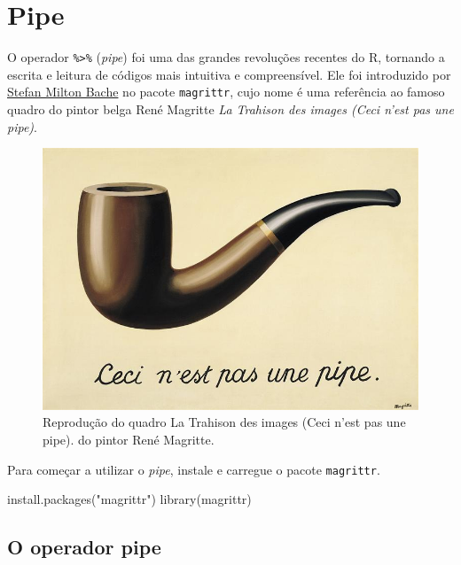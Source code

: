 \documentclass[
]{book}
\newenvironment{Shaded}{\begin{snugshade}}{\end{snugshade}}
\newcommand{\FunctionTok}[1]{\textcolor[rgb]{0.00,0.00,0.00}{#1}}
\newcommand{\NormalTok}[1]{#1}
\newcommand{\StringTok}[1]{\textcolor[rgb]{0.31,0.60,0.02}{#1}}
\begin{document}
\hypertarget{pipe}{%
\chapter{Pipe}\label{pipe}}

O operador \texttt{\%\textgreater{}\%} (\emph{pipe}) foi uma das grandes revoluções recentes do R, tornando a escrita e leitura de códigos mais intuitiva e compreensível. Ele foi introduzido por \href{https://github.com/smbache}{Stefan Milton Bache} no pacote \texttt{magrittr}, cujo nome é uma referência ao famoso quadro do pintor belga René Magritte \emph{La Trahison des images (Ceci n'est pas une pipe)}.

\begin{figure}
\centering
\includegraphics{assets/img/pipe/ceci-nest-pas-une-pipe.jpg}
\caption{\label{fig:unnamed-chunk-2}Reprodução do quadro La Trahison des images (Ceci n'est pas une pipe). do pintor René Magritte.}
\end{figure}

Para começar a utilizar o \emph{pipe}, instale e carregue o pacote \texttt{magrittr}.

\begin{Shaded}
\begin{Highlighting}[]
\FunctionTok{install.packages}\NormalTok{(}\StringTok{"magrittr"}\NormalTok{)}
\FunctionTok{library}\NormalTok{(magrittr)}
\end{Highlighting}
\end{Shaded}

\hypertarget{o-operador-pipe}{%
\section{O operador pipe}\label{o-operador-pipe}}
\end{document}
